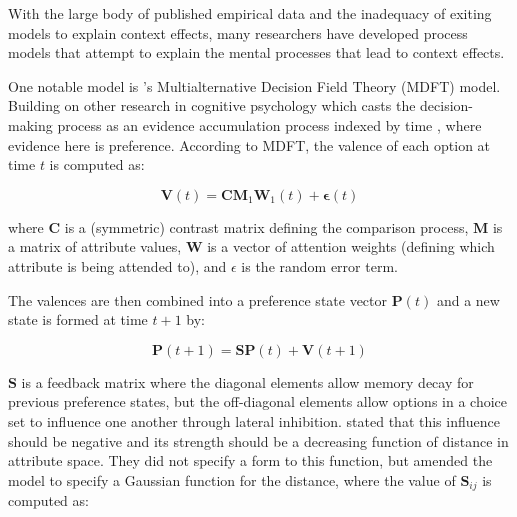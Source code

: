 With the large body of published empirical data and the inadequacy of exiting models to explain context effects, many researchers have developed process models that attempt to explain the mental processes that lead to context effects. 


One notable model is \textcite{roeMultialternativeDecisionField2001a}'s Multialternative Decision Field Theory (MDFT) model. Building on other research in cognitive psychology which casts the decision-making process as an evidence accumulation process indexed by time \parencite{ratcliff1978theory}, where evidence here is preference. According to MDFT, the valence  of each option at time $t$ is computed as:

\begin{equation}
    \boldsymbol{V}(t)=\boldsymbol{C}\boldsymbol{M}_1\boldsymbol{W}_1(t) + \boldsymbol{\epsilon}(t)
    \label{eqn:mdft}
\end{equation}

where $\boldsymbol{C}$ is a (symmetric) contrast matrix defining the comparison process, $\boldsymbol{M}$ is a matrix of attribute values, $\boldsymbol{W}$ is a vector of attention weights (defining which attribute is being attended to), and $\epsilon$ is the random error term. 

The valences are then combined into a preference state vector $\boldsymbol{P}(t)$ and a new state is formed at time $t+1$ by:

\begin{equation}
    \boldsymbol{P}(t+1)=\boldsymbol{SP}(t)+\boldsymbol{V}(t+1)
    \label{eqn:mdft1}
\end{equation}

$\boldsymbol{S}$ is a feedback matrix where the diagonal elements allow memory decay for previous preference states, but the off-diagonal elements allow options in a choice set to influence one another through lateral inhibition. \textcite{roeMultialternativeDecisionField2001a} stated that this influence should be negative and its strength should be a decreasing function of distance in attribute space. They did not specify a form to this function, but \textcite{hotalingTheoreticalDevelopmentsDecision2010} amended the model to specify a Gaussian function for the distance, where the value of $\boldsymbol{S}_{ij}$ is computed as:

